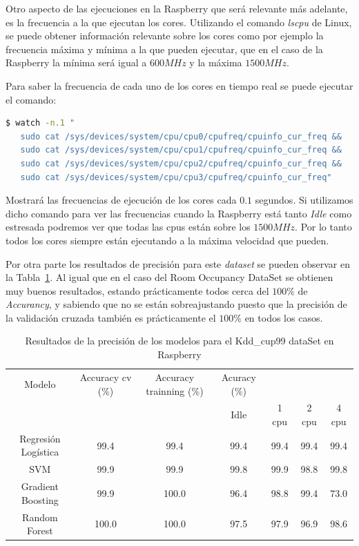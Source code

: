 \documentclass[a4paper, 12pt]{book}
\begin{document}
Otro aspecto de las ejecuciones en la Raspberry  que será relevante más adelante, es la frecuencia a la que ejecutan los cores. Utilizando el comando \textit{lscpu} de Linux, se puede obtener información relevante sobre los cores como por ejemplo la frecuencia máxima y mínima a la que pueden ejecutar, que en el caso de la Raspberry la mínima será igual a $600MHz$ y la máxima $1500MHz$. 

Para saber la frecuencia de cada uno de los cores en tiempo real se puede ejecutar el comando:\\

\begin{lstlisting}[language=bash, showstringspaces=false]
   $ watch -n.1 "
   sudo cat /sys/devices/system/cpu/cpu0/cpufreq/cpuinfo_cur_freq && 
   sudo cat /sys/devices/system/cpu/cpu1/cpufreq/cpuinfo_cur_freq && 
   sudo cat /sys/devices/system/cpu/cpu2/cpufreq/cpuinfo_cur_freq && 
   sudo cat /sys/devices/system/cpu/cpu3/cpufreq/cpuinfo_cur_freq"
\end{lstlisting}

Mostrará las frecuencias de ejecución de los cores cada $0.1$ segundos. Si utilizamos dicho comando para ver las frecuencias cuando la Raspberry está tanto \textit{Idle} como estresada podremos ver que todas las cpus están sobre los $1500MHz$. Por lo tanto todos los cores siempre están ejecutando a la máxima velocidad que pueden.

Por otra parte los resultados de precisión para este \textit{dataset} se pueden observar en la Tabla~\ref{tab:acc_Kddraspberry}. Al igual que en el caso del Room Occupancy DataSet se obtienen muy buenos resultados, estando prácticamente todos cerca del $100\%$ de \textit{Accurancy}, y sabiendo que no se están sobreajustando puesto que la precisión de la validación cruzada también es prácticamente el $100\%$ en todos los casos.

\begin{table}[]
\begin{adjustbox}{width=\textwidth}
\centering
    \begin{tabular}{c  c  c  c  c  c  c}
    \hline
    Modelo & Accuracy cv (\%) & Accuracy trainning (\%) & Acuracy (\%) & & & \\
    \cline{4-7}
     &  &   &  Idle & 1 cpu & 2 cpu & 4 cpu \\
     \hline
     Regresión Logística & 99.4 & 99.4 & 99.4 & 99.4 & 99.4 & 99.4\\
     SVM & 99.9 & 99.9 & 99.8 & 99.9 & 98.8 & 99.8\\
     Gradient Boosting & 99.9 & 100.0 & 96.4 & 98.8 & 99.4 & 73.0\\
     Random Forest & 100.0 & 100.0 & 97.5 & 97.9 & 96.9 & 98.6\\
    \hline
    \end{tabular}
\end{adjustbox}
\caption{Resultados de la precisión de los modelos para el Kdd\_cup99 dataSet en Raspberry}
\label{tab:acc_Kddraspberry}
\end{table}
\end{document}
